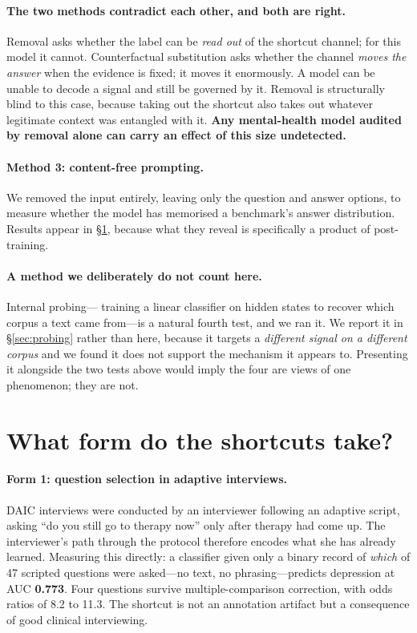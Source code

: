 \documentclass{article}
\begin{document}
\paragraph{The two methods contradict each other, and both are right.} Removal
asks whether the label can be \emph{read out} of the shortcut channel; for this
model it cannot. Counterfactual substitution asks whether the channel
\emph{moves the answer} when the evidence is fixed; it moves it enormously. A
model can be unable to decode a signal and still be governed by it. Removal is
structurally blind to this case, because taking out the shortcut also takes out
whatever legitimate context was entangled with it. \textbf{Any mental-health
model audited by removal alone can carry an effect of this size undetected.}

\paragraph{Method 3: content-free prompting.} We removed the input entirely,
leaving only the question and answer options, to measure whether the model has
memorised a benchmark's answer distribution. Results appear in
\S\ref{sec:forms}, because what they reveal is specifically a product of
post-training.

\paragraph{A method we deliberately do not count here.} Internal probing---
training a linear classifier on hidden states to recover which corpus a text
came from---is a natural fourth test, and we ran it. We report it in
\S\ref{sec:probing} rather than here, because it targets a \emph{different
signal on a different corpus} and we found it does not support the mechanism it
appears to. Presenting it alongside the two tests above would imply the four are
views of one phenomenon; they are not.

\section{What form do the shortcuts take?}
\label{sec:forms}

\paragraph{Form 1: question selection in adaptive interviews.} DAIC interviews
were conducted by an interviewer following an adaptive script, asking ``do you
still go to therapy now'' only after therapy had come up. The interviewer's path
through the protocol therefore encodes what she has already learned. Measuring
this directly: a classifier given only a binary record of \emph{which} of 47
scripted questions were asked---no text, no phrasing---predicts depression at
AUC \textbf{0.773}. Four questions survive multiple-comparison correction, with
odds ratios of 8.2 to 11.3. The shortcut is not an annotation artifact but a
consequence of good clinical interviewing.
\end{document}
